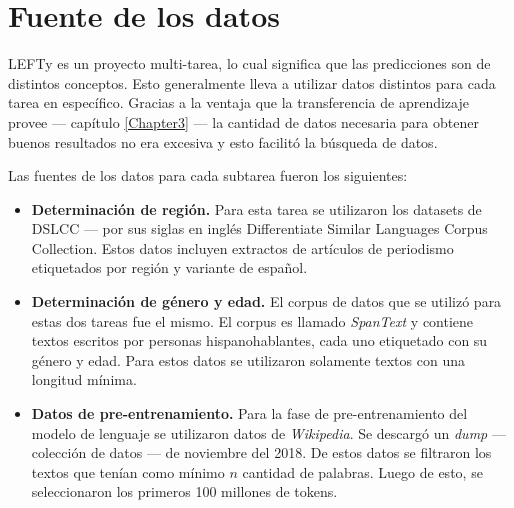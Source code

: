 \section{Fuente de los datos}

LEFTy es un proyecto multi-tarea, lo cual significa que las predicciones son de distintos conceptos. Esto generalmente lleva a utilizar datos distintos para cada tarea en específico. Gracias a la ventaja que la transferencia de aprendizaje provee --- capítulo \ref{Chapter3} --- la cantidad de datos necesaria para obtener buenos resultados no era excesiva y esto facilitó la búsqueda de datos.

Las fuentes de los datos para cada subtarea fueron los siguientes:

\begin{itemize}
\item \textbf{Determinación de región.} Para esta tarea se utilizaron los datasets de DSLCC \parencite{tan:2014:BUCC} --- por sus siglas en inglés Differentiate Similar Languages Corpus Collection. Estos datos incluyen extractos de artículos de periodismo etiquetados por región y variante de español.

\item \textbf{Determinación de género y edad.} El corpus de datos que se utilizó para estas dos tareas fue el mismo. El corpus es llamado \textit{SpanText} \parencite{villegas:2014:CACIC} y contiene textos escritos por personas hispanohablantes, cada uno etiquetado con su género y edad. Para estos datos se utilizaron solamente textos con una longitud mínima.

\item \textbf{Datos de pre-entrenamiento.} Para la fase de pre-entrenamiento del modelo de lenguaje se utilizaron datos de \textit{Wikipedia}. Se descargó un \textit{dump} --- colección de datos --- de noviembre del 2018. De estos datos se filtraron los textos que tenían como mínimo $n$ cantidad de palabras. Luego de esto, se seleccionaron los primeros 100 millones de tokens.
\end{itemize}

\begin{comment}
seguir aca con detalles de datos si es necesario
\end{comment}




